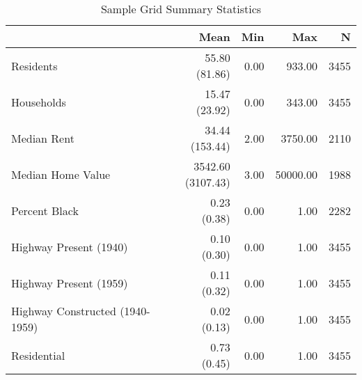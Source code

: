 \begin{table}[h]
\centering
\caption{Sample Grid Summary Statistics}
\label{tab:summary_stats}
\begin{tabular*}{\linewidth}{@{\extracolsep{\fill}}l*{4}{r}}
\toprule
 & Mean & Min & Max & N \\
\midrule
Residents & \makecell[tr]{55.80 \\ (81.86)} & 0.00 & 933.00 & 3455 \\
Households & \makecell[tr]{15.47 \\ (23.92)} & 0.00 & 343.00 & 3455 \\
Median Rent & \makecell[tr]{34.44 \\ (153.44)} & 2.00 & 3750.00 & 2110 \\
Median Home Value & \makecell[tr]{3542.60 \\ (3107.43)} & 3.00 & 50000.00 & 1988 \\
Percent Black & \makecell[tr]{0.23 \\ (0.38)} & 0.00 & 1.00 & 2282 \\
Highway Present (1940) & \makecell[tr]{0.10 \\ (0.30)} & 0.00 & 1.00 & 3455 \\
Highway Present (1959) & \makecell[tr]{0.11 \\ (0.32)} & 0.00 & 1.00 & 3455 \\
Highway Constructed (1940-1959) & \makecell[tr]{0.02 \\ (0.13)} & 0.00 & 1.00 & 3455 \\
Residential & \makecell[tr]{0.73 \\ (0.45)} & 0.00 & 1.00 & 3455 \\
\bottomrule
\end{tabular*}
\end{table}
